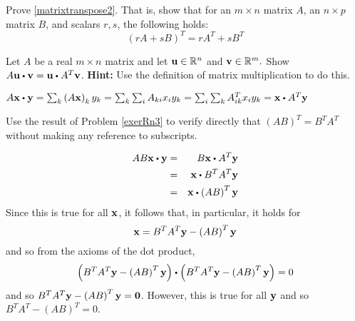 \begin{enumialphparenastyle}
\begin{ex} Prove \ref{matrixtranspose2}. That is, show that for an $m \times n$ matrix $A$, an $n \times p$ matrix $B$, and scalars $r, s$, the following holds:
\[
\left( rA + sB \right) ^T = rA^{T} + sB^{T}
\]
\end{ex}

\begin{ex} \label{exerRn3}  Let $A$ be a real $m\times n$ matrix and
let ${\bf u}\in \mathbb{R}^{n}$ and ${\bf v}\in \mathbb{R}^{m}.$ Show 
$A\vect{u}\dotprod \vect{v}=\vect{u}\dotprod A^{T}\vect{v}$. 
\textbf{Hint:} Use the definition of matrix
multiplication to do this.
\begin{sol}
$A\vect{x}\dotprod \vect{y}=\sum_{k}\left( A\vect{x}
\right) _{k}y_{k}=\sum_{k}\sum_{i}A_{ki}x_{i}y_{k}=\sum_{i}
\sum_{k}A_{ik}^{T}x_{i}y_{k}= \vect{x} \dotprod A^{T}\vect{y} $
\end{sol}
\end{ex}

\begin{ex} Use the result of Problem \ref{exerRn3} to verify directly
that $\left( AB\right) ^{T}=B^{T}A^{T}$ without making any reference to
subscripts.
\begin{sol}
\begin{eqnarray*}
 AB\vect{x} \dotprod \vect{y} &=& B\vect{x} \dotprod A^{T}\vect{y} \\ 
&=& \vect{x}\dotprod B^{T}A^{T}\vect{y} \\
&=& \vect{x}\dotprod \left( AB\right) ^{T} \vect{y}
\end{eqnarray*}
Since this is true for all ${\bf x}$, it follows that, in particular, it
holds for
\[
{\bf x}=B^{T}A^{T}{\bf y}-\left( AB\right) ^{T}{\bf y}
\]
and so from the axioms of the dot product,
\[
\left( B^{T}A^{T}\vect{y}-\left( AB\right) ^{T}\vect{y}\right) \dotprod \left(B^{T}A^{T}
\vect{y}-\left( AB\right) ^{T}\vect{y}\right) =0
\]
and so $B^{T}A^{T}{\bf y}-\left( AB\right) ^{T}{\bf y}={\bf 0}$. However,
this is true for all ${\bf y}$ and so $B^{T}A^{T}-\left(
AB\right) ^{T}=0.$
\end{sol}
\end{ex}
 
\end{enumialphparenastyle}